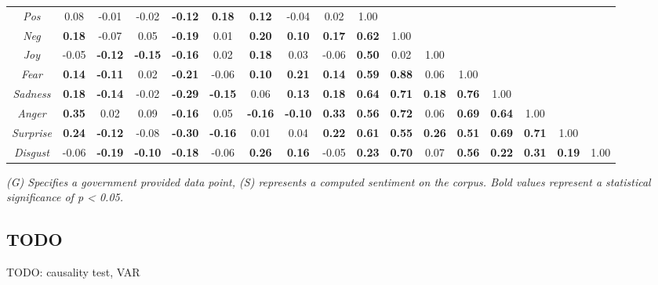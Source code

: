 \begin{landscape}
\begin{table}[]
{\begin{tabular}{@{}|c|cccccccccccccccc|@{}}
\textit{Pos} & 0.08 & -0.01 & -0.02 & \textbf{-0.12} & \textbf{0.18} & \textbf{0.12} & -0.04 & 0.02 & 1.00 & \textbf{} & \textbf{} & \textbf{} & \textbf{} & \textbf{} & \textbf{} & \textbf{} \\
\textit{Neg} & \textbf{0.18} & -0.07 & 0.05 & \textbf{-0.19} & 0.01 & \textbf{0.20} & \textbf{0.10} & \textbf{0.17} & \textbf{0.62} & 1.00 & \textbf{} & \textbf{} & \textbf{} & \textbf{} & \textbf{} & \textbf{} \\
\textit{Joy} & -0.05 & \textbf{-0.12} & \textbf{-0.15} & \textbf{-0.16} & 0.02 & \textbf{0.18} & 0.03 & -0.06 & \textbf{0.50} & 0.02 & 1.00 & \textbf{} & \textbf{} & \textbf{} & \textbf{} & \textbf{} \\
\textit{Fear} & \textbf{0.14} & \textbf{-0.11} & 0.02 & \textbf{-0.21} & -0.06 & \textbf{0.10} & \textbf{0.21} & \textbf{0.14} & \textbf{0.59} & \textbf{0.88} & 0.06 & 1.00 & \textbf{} & \textbf{} & \textbf{} & \textbf{} \\
\textit{Sadness} & \textbf{0.18} & \textbf{-0.14} & -0.02 & \textbf{-0.29} & \textbf{-0.15} & 0.06 & \textbf{0.13} & \textbf{0.18} & \textbf{0.64} & \textbf{0.71} & \textbf{0.18} & \textbf{0.76} & 1.00 & \textbf{} & \textbf{} & \textbf{} \\
\textit{Anger} & \textbf{0.35} & 0.02 & 0.09 & \textbf{-0.16} & 0.05 & \textbf{-0.16} & \textbf{-0.10} & \textbf{0.33} & \textbf{0.56} & \textbf{0.72} & 0.06 & \textbf{0.69} & \textbf{0.64} & 1.00 & \textbf{} & \textbf{} \\
\textit{Surprise} & \textbf{0.24} & \textbf{-0.12} & -0.08 & \textbf{-0.30} & \textbf{-0.16} & 0.01 & 0.04 & \textbf{0.22} & \textbf{0.61} & \textbf{0.55} & \textbf{0.26} & \textbf{0.51} & \textbf{0.69} & \textbf{0.71} & 1.00 & \textbf{} \\
\textit{Disgust} & -0.06 & \textbf{-0.19} & \textbf{-0.10} & \textbf{-0.18} & -0.06 & \textbf{0.26} & \textbf{0.16} & -0.05 & \textbf{0.23} & \textbf{0.70} & 0.07 & \textbf{0.56} & \textbf{0.22} & \textbf{0.31} & \textbf{0.19} & 1.00 \\ \bottomrule
\end{tabular}%
}
\emph{(G) Specifies a government provided data point, (S) represents a computed sentiment on the corpus. Bold values represent a statistical significance of p < 0.05.}
\end{table}
\end{landscape}

\subsection{TODO}

TODO: causality test, VAR